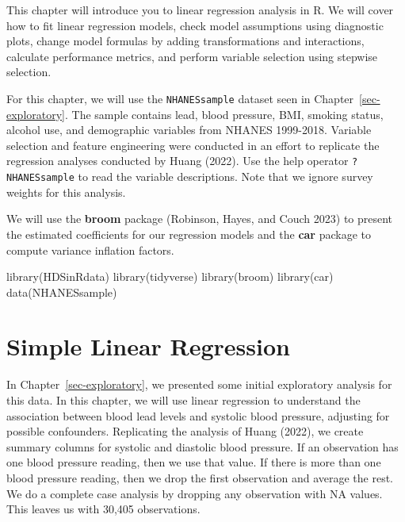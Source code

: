 \documentclass[
  letterpaper,
]{krantz}
\makeatletter
\newenvironment{Shaded}{\begin{snugshade}}{\end{snugshade}}
\newcommand{\FunctionTok}[1]{\textcolor[rgb]{0.28,0.35,0.67}{#1}}
\newcommand{\NormalTok}[1]{\textcolor[rgb]{0.00,0.23,0.31}{#1}}
\newenvironment{kframe}{%
\medskip{}
\setlength{\fboxsep}{.8em}
 \def\at@end@of@kframe{}%
 \ifinner\ifhmode%
  \def\at@end@of@kframe{\end{minipage}}%
  \begin{minipage}{\columnwidth}%
 \fi\fi%
 \def\FrameCommand##1{\hskip\@totalleftmargin \hskip-\fboxsep
 \colorbox{shadecolor}{##1}\hskip-\fboxsep
     \hskip-\linewidth \hskip-\@totalleftmargin \hskip\columnwidth}%
 \MakeFramed {\advance\hsize-\width
   \@totalleftmargin\z@ \linewidth\hsize
   \@setminipage}}%
 {\par\unskip\endMakeFramed%
 \at@end@of@kframe}
\renewenvironment{Shaded}{\begin{kframe}}{\end{kframe}}
\makeatother
\begin{document}
This chapter will introduce you to linear regression analysis in R. We
will cover how to fit linear regression models, check model assumptions
using diagnostic plots, change model formulas by adding transformations
and interactions, calculate performance metrics, and perform variable
selection using stepwise selection.

For this chapter, we will use the \texttt{NHANESsample} dataset seen in
Chapter~\ref{sec-exploratory}. The sample contains lead, blood pressure,
BMI, smoking status, alcohol use, and demographic variables from NHANES
1999-2018. Variable selection and feature engineering were conducted in
an effort to replicate the regression analyses conducted by Huang
(2022). Use the help operator \texttt{?NHANESsample} to read the
variable descriptions. Note that we ignore survey weights for this
analysis.

We will use the \textbf{broom} package (Robinson, Hayes, and Couch 2023)
to present the estimated coefficients for our regression models and the
\textbf{car} package to compute variance inflation factors.

\begin{Shaded}
\begin{Highlighting}[]
\FunctionTok{library}\NormalTok{(HDSinRdata)}
\FunctionTok{library}\NormalTok{(tidyverse)}
\FunctionTok{library}\NormalTok{(broom)}
\FunctionTok{library}\NormalTok{(car)}
\FunctionTok{data}\NormalTok{(NHANESsample)}
\end{Highlighting}
\end{Shaded}

\hypertarget{simple-linear-regression}{%
\section{Simple Linear Regression}\label{simple-linear-regression}}

In Chapter~\ref{sec-exploratory}, we presented some initial exploratory
analysis for this data. In this chapter, we will use linear regression
to understand the association between blood lead levels and systolic
blood pressure, adjusting for possible confounders. Replicating the
analysis of Huang (2022), we create summary columns for systolic and
diastolic blood pressure. If an observation has one blood pressure
reading, then we use that value. If there is more than one blood
pressure reading, then we drop the first observation and average the
rest. We do a complete case analysis by dropping any observation with NA
values. This leaves us with 30,405 observations.
\end{document}
